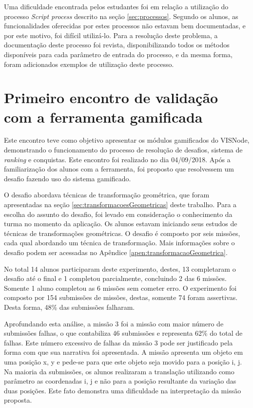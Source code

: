 \documentclass[
	12pt,				%
	oneside,			%
	a4paper,			%
	english,			%
	french,				%
	spanish,			%
	brazil,				%
	]{abntex2}
\begin{document}
Uma dificuldade encontrada pelos estudantes foi em relação a utilização do processo \textit{Script process} descrito na seção \ref{sec:processos}. Segundo os alunos, as funcionalidades oferecidas por estes processos não estavam bem documentadas, e por este motivo, foi difícil utilizá-lo. Para a resolução deste problema, a documentação deste processo foi revista, disponibilizando todos os métodos disponíveis para cada parâmetro de entrada do processo, e da mesma forma, foram adicionados exemplos de utilização deste processo.

\section{Primeiro encontro de validação com a ferramenta gamificada}
\label{sec:validacaoPrimeiroEncontro}

Este encontro teve como objetivo apresentar os módulos gamificados do VISNode, demonstrando o funcionamento do processo de resolução de desafios, sistema de \textit{ranking} e conquistas. Este encontro foi realizado no dia 04/09/2018. Após a familiarização dos alunos com a ferramenta, foi proposto que resolvessem um desafio fazendo uso do sistema gamificado.

O desafio abordava técnicas de transformação geométrica, que foram apresentadas na seção \ref{sec:transformacoesGeometricas} deste trabalho. Para a escolha do assunto do desafio, foi levado em consideração o conhecimento da turma no momento da aplicação. Os alunos estavam iniciando seus estudos de técnicas de transformações geométricas. O desafio é composto por seis missões, cada qual abordando um técnica de transformação. Mais informações sobre o desafio podem ser acessadas no Apêndice \ref{apen:transformacaoGeometrica}.

No total 14 alunos participaram deste experimento, destes, 13 completaram o desafio até o final e 1 completou parcialmente, concluindo 2 das 6 missões. Somente 1 aluno completou as 6 missões sem cometer erro. O experimento foi composto por 154 submissões de missões, destas, somente 74 foram assertivas. Desta forma, 48\% das submissões falharam.

Aprofundando esta análise, a missão 3 foi a missão com maior número de submissões falhas, o que contabiliza 46 submissões e representa 62\% do total de falhas. Este número excessivo de falhas da missão 3 pode ser justificado pela forma com que sua narrativa foi apresentada. A missão apresenta um objeto em uma posição x, y e pede-se para que este objeto seja movido para a posição i, j. Na maioria da submissões, os alunos realizaram a translação utilizando como parâmetro as coordenadas i, j e não para a posição resultante da variação das duas posições. Este fato demonstra uma dificuldade na interpretação da missão proposta.
\end{document}
